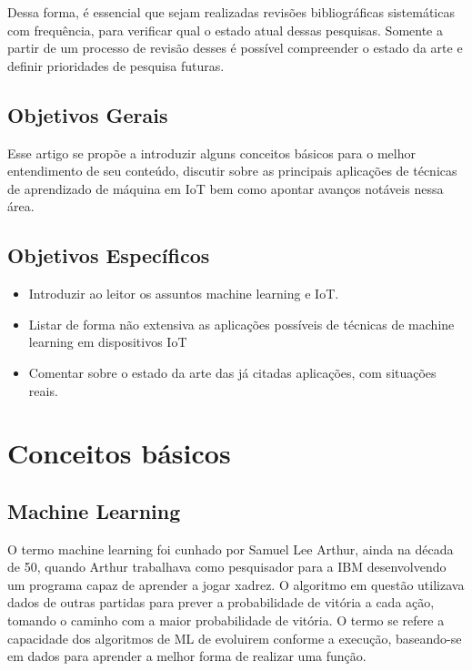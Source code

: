 \documentclass[12pt]{article}
\begin{document}
Dessa forma, é essencial que sejam realizadas revisões bibliográficas sistemáticas com frequência, para verificar qual o estado atual dessas pesquisas. Somente a partir de um processo
de revisão desses é possível compreender o estado da arte e definir prioridades de pesquisa futuras.

\subsection{Objetivos Gerais}

Esse artigo se propõe a introduzir alguns conceitos básicos para o melhor entendimento de seu conteúdo, discutir sobre as principais aplicações de técnicas de aprendizado de máquina em IoT bem como apontar avanços notáveis nessa área.

\subsection{Objetivos Específicos}

\begin{itemize}
    \item Introduzir ao leitor os assuntos machine learning e IoT.
    \item Listar de forma não extensiva as aplicações possíveis de técnicas de machine learning em dispositivos IoT
    \item Comentar sobre o estado da arte das já citadas aplicações, com situações reais. 
\end{itemize}

\section{Conceitos básicos}

\subsection{Machine Learning}

O termo machine learning foi cunhado por Samuel Lee Arthur, ainda na década de 50, quando Arthur trabalhava como pesquisador para a IBM desenvolvendo um programa capaz de aprender a jogar xadrez. O algoritmo em questão utilizava dados de outras partidas para prever a probabilidade de vitória a cada ação, tomando o caminho com a maior probabilidade de vitória. O termo se refere a capacidade dos algoritmos de ML de evoluirem conforme a execução, baseando-se em dados para aprender a melhor forma de realizar uma função. 
\end{document}
